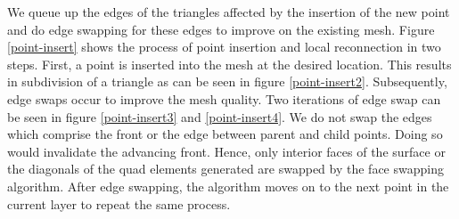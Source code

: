 \documentclass[conf]{new-aiaa}
\begin{document}
We queue up the edges of the triangles affected by the insertion of the new point and do edge swapping for these edges to improve on the existing mesh. Figure \ref{point-insert} shows the process of point insertion and local reconnection in two steps. First, a point is inserted into the mesh at the desired location. This results in subdivision of a triangle as can be seen in figure \ref{point-insert2}. Subsequently, edge swaps occur to improve the mesh quality. Two iterations of edge swap can be seen in figure \ref{point-insert3} and \ref{point-insert4}. We do not swap the edges which comprise the front or the edge between parent and child points. Doing so would invalidate the advancing front. Hence, only interior faces of the surface or the diagonals of the quad elements generated are swapped by the face swapping algorithm. After edge swapping, the algorithm moves on to the next point in the current layer to repeat the same process.
\end{document}
